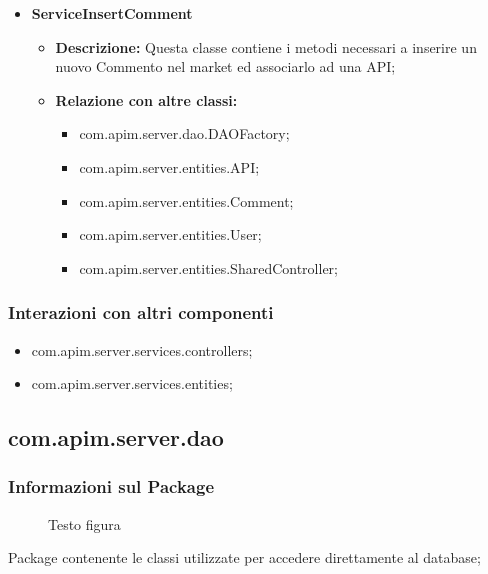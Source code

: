 {{{{\begin{itemize}
\begin{itemize}
            \item \textbf{Relazione con altre classi:}
            \begin{itemize}
              \item com.apim.server.dao.DAOFactory;
              \item com.apim.server.entities.API;
              \item com.apim.server.entities.SharedController;
            \end{itemize}
          \end{itemize}
          \item \textbf{ServiceInsertComment}
          \begin{itemize}
            \item \textbf{Descrizione:} Questa classe contiene i metodi necessari a inserire un nuovo Commento nel market ed associarlo ad una API;
            \item \textbf{Relazione con altre classi:}
            \begin{itemize}
              \item com.apim.server.dao.DAOFactory;
              \item com.apim.server.entities.API;
              \item com.apim.server.entities.Comment;
              \item com.apim.server.entities.User;
              \item com.apim.server.entities.SharedController;
            \end{itemize}
          \end{itemize}
       \end{itemize}
       \subsubsection{Interazioni con altri componenti}
          \begin{itemize}
            \item com.apim.server.services.controllers;
            \item com.apim.server.services.entities;
          \end{itemize}
          
          
          \subsection{com.apim.server.dao}{
    \subsubsection{Informazioni sul Package}
        \begin{figure}[ht]
          \centering
          \caption{Testo figura}
          \label{Testo figura}
        \end{figure}
       Package  contenente le classi utilizzate per accedere direttamente al database;
}}}}}
